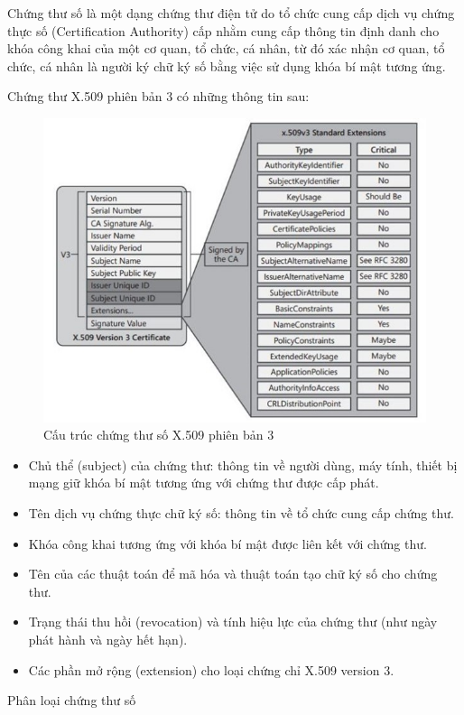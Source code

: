 Chứng thư số là một dạng chứng thư điện tử do tổ chức cung cấp dịch vụ chứng thực số (Certification Authority) cấp nhằm cung cấp thông tin định danh cho khóa công khai của một cơ quan, tổ chức, cá nhân, từ đó xác nhận cơ quan, tổ chức, cá nhân là người ký chữ ký số bằng việc sử dụng khóa bí mật tương ứng. 

Chứng thư X.509 phiên bản 3 có những thông tin sau:
\begin{figure}[htbp]
\centering
\includegraphics[width=.9\linewidth]{img/x509v3.jpg}
\caption{Cấu trúc chứng thư số X.509 phiên bản 3}
\end{figure}
\begin{itemize}

\item Chủ thể (subject) của chứng thư: thông tin về người dùng, máy tính, thiết bị mạng giữ khóa bí mật tương ứng với chứng thư được cấp phát.
\item Tên dịch vụ chứng thực chữ ký số: thông tin về tổ chức cung cấp chứng thư.
\item Khóa công khai tương ứng với khóa bí mật được liên kết với chứng thư.
\item Tên của các thuật toán để mã hóa và thuật toán tạo chữ ký số cho chứng thư.
\item Trạng thái thu hồi (revocation) và tính hiệu lực của chứng thư (như ngày phát hành và ngày hết hạn).
\item Các phần mở rộng (extension) cho loại chứng chỉ X.509 version 3.

\end{itemize}

Phân loại chứng thư số

